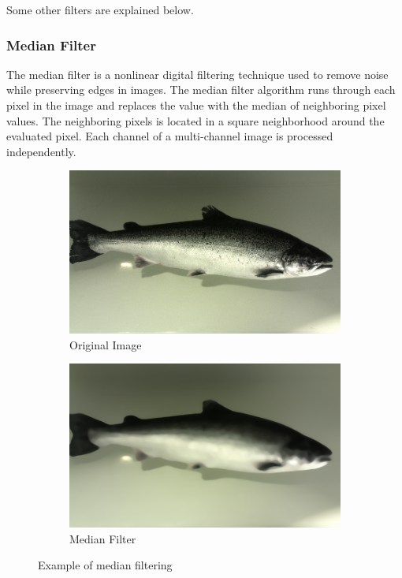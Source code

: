 Some other filters are explained below.


\subsubsection{Median Filter}
The median filter is a nonlinear digital filtering technique used to remove noise while preserving edges in images. The median filter algorithm runs through each pixel in the image and replaces the value with the median of neighboring pixel values. The neighboring pixels is located in a square neighborhood around the evaluated pixel. Each channel of a multi-channel image is processed independently. 

\begin{figure}[h]
    \centering
    \begin{subfigure}{0.5\textwidth}
        \centering
        \includegraphics[width=.98\linewidth]{images/literature/original_fish}
        \caption{Original Image}
    \end{subfigure}%
    \begin{subfigure}{.5\textwidth}
        \centering
        \includegraphics[width=.98\linewidth]{images/literature/median}
        \caption{Median Filter}
    \end{subfigure}
    \caption{Example of median filtering}
    \label{fig:median_filter}
\end{figure}

